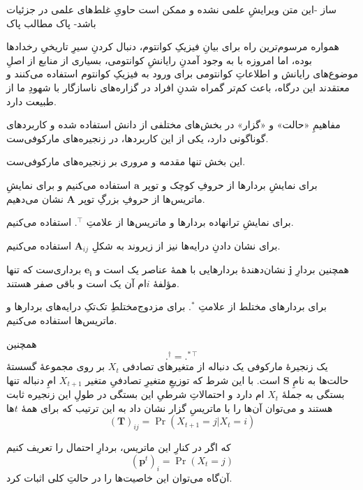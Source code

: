 \documentclass[a4paper,12pt]{article}
\begin{document}

‌ساز
-این متن ویرایشِ علمی نشده و ممکن است حاویِ غلط‌های علمی در جزئیات باشد-
‌پاک
‌مطالب
‌پاک

همواره مرسوم‌ترین راه برای بیانِ فیزیکِ کوانتوم، دنبال کردنِ سیرِ تاریخیِ رخدادها بوده، اما امروزه با به وجود آمدنِ رایانشِ کوانتومی، بسیاری از منابع از اصلِ موضوع‌های رایانش و اطلاعاتِ کوانتومی برای ورود به فیزیکِ کوانتوم استفاده می‌کنند و معتقدند این درگاه، باعث کم‌تر گمراه شدنِ افراد در گزاره‌های ناسازگار با شهودِ ما از طبیعت دارد.

مفاهیمِ «حالت» و «گزار» در بخش‌های مختلفی از دانش استفاده شده و کاربردهای گوناگونی دارد، یکی از این کاربردها، در زنجیره‌های مارکوفی‌ست.

این بخش تنها مقدمه و مروری بر زنجیره‌های مارکوفی‌ست.

برای نمایشِ بردارها از حروفِ کوچک و توپر 
\( \mathbf{a} \)
استفاده می‌کنیم و برای نمایشِ ماتریس‌ها از حروفِ بزرگِ تو‌پر
\( \mathbf{A} \)
نشان می‌دهیم.

برای نمایشِ ترانهاده بردارها و ماتریس‌ها از علامتِ
\( .^\intercal \)
استفاده می‌کنیم.

برای نشان دادنِ درایه‌ها نیز از زیروند به شکلِ
\( \mathbf{A}_{ij} \)
استفاده می‌کنیم.

همچنین بردارِ 
\( \mathbf{j} \)
نشان‌دهندهٔ بردارهایی با همهٔ عناصر یک است و
\( \mathbf{e_i} \)
برداری‌ست که تنها مؤلفهٔ \( i \)ام آن یک است و باقی صفر هستند.

برای بردارهای  مختلط از علامتِ 
\( .^* \)
برای مزدوج‌مختلطِ تک‌تکِ درایه‌های بردارها و ماتریس‌ها استفاده می‌کنیم.

همچنین
\begin{equation} .^\dagger = .^{*\intercal} \end{equation}
یک زنجیرهٔ مارکوفی یک دنباله از متغیرهای تصادفی \( X_t \)‌ بر روی مجموعهٔ گسستهٔ حالت‌ها به نامِ 
\( \mathbf{S} \)
 است. با این شرط که توزیعِ متغیرِ تصادفیِ متغیر 
\( X_{t+1} \)
 امِ دنباله تنها بستگی به جملهٔ 
\( X_{t} \)
 ام دارد و احتمالاتِ شرطیِ این بستگی در طولِ این زنجیره ثابت هستند و می‌توان آن‌ها را با ماتریسِ گزار نشان داد به این ترتیب که برای همهٔ \( t \)ها
\begin{equation} (\mathbf{T})_{ij} = \Pr(X_{t+1} = j | X_t = i) \end{equation}

که اگر در کنارِ این ماتریس، بردارِ احتمال را تعریف کنیم
\begin{equation} (\mathbf{p}^t)_i = \Pr(X_t = j) \end{equation}
آن‌گاه می‌توان این خاصیت‌ها را در حالتِ کلی اثبات کرد.
\end{document}

